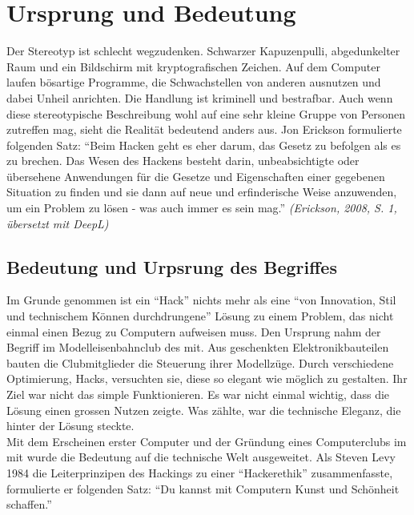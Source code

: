 \documentclass[11pt, a4paper]{article}
\begin{document}
\section{Ursprung und Bedeutung}
Der Stereotyp ist schlecht wegzudenken. Schwarzer Kapuzenpulli, abgedunkelter Raum und ein Bildschirm mit kryptografischen Zeichen. Auf dem Computer laufen bösartige Programme, die Schwachstellen von anderen ausnutzen und dabei Unheil anrichten. Die Handlung ist kriminell und bestrafbar. Auch wenn diese stereotypische Beschreibung wohl auf eine sehr kleine Gruppe von Personen zutreffen mag, sieht die Realität bedeutend anders aus. Jon Erickson formulierte folgenden Satz: ``Beim Hacken geht es eher darum, das Gesetz zu befolgen als es zu brechen. Das Wesen des Hackens besteht darin, unbeabsichtigte oder übersehene Anwendungen für die Gesetze und Eigenschaften einer gegebenen Situation zu finden und sie dann auf neue und erfinderische Weise anzuwenden, um ein Problem zu lösen - was auch immer es sein mag.'' \textit{(Erickson, 2008, S. 1, übersetzt mit DeepL)} \cite{erickson2008hacking}



\subsection{Bedeutung und Urpsrung des Begriffes}
Im Grunde genommen ist ein ``Hack'' nichts mehr als eine ``von Innovation, Stil und technischem Können durchdrungene'' Lösung zu einem Problem, das nicht einmal einen Bezug zu Computern aufweisen muss. Den Ursprung nahm der Begriff im Modelleisenbahnclub des \gls{mit}. Aus geschenkten Elektronikbauteilen bauten die Clubmitglieder die Steuerung ihrer Modellzüge. Durch verschiedene Optimierung, Hacks, versuchten sie, diese so elegant wie möglich zu gestalten. Ihr Ziel war nicht das simple Funktionieren. Es war nicht einmal wichtig, dass die Lösung einen grossen Nutzen zeigte. Was zählte, war die technische Eleganz, die hinter der Lösung steckte. \\Mit dem Erscheinen erster Computer und der Gründung eines Computerclubs im \gls{mit} wurde die Bedeutung auf die technische Welt ausgeweitet. Als Steven Levy 1984 die Leiterprinzipen des Hackings zu einer ``Hackerethik'' zusammenfasste, formulierte er folgenden Satz: ``Du kannst mit Computern Kunst und Schönheit schaffen.'' \cite{bpbKleineGeschichte:online}
\end{document}
